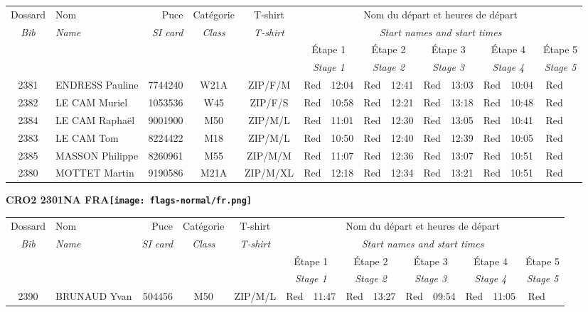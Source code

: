\documentclass{report}
\begin{document}
  \begin{longtable}{|c|l|r|c|c|*{5}{cc|}}
    Dossard & Nom  & Puce    & Catégorie & T-shirt & \multicolumn{10}{c|}{Nom du départ et heures de départ} \\
    \itshape Bib     & \itshape Name & \itshape SI card & \itshape Class  & \itshape  T-shirt  & \multicolumn{10}{c|}{\itshape Start names and start times} \\
    \hline
    & & & & & \multicolumn{2}{c|}{Étape 1} & \multicolumn{2}{c|}{Étape 2} & \multicolumn{2}{c|}{Étape 3} & \multicolumn{2}{c|}{Étape 4} & \multicolumn{2}{c|}{Étape 5} \\
    & & & & & \multicolumn{2}{c|}{\itshape Stage 1} & \multicolumn{2}{c|}{\itshape Stage 2} & \multicolumn{2}{c|}{\itshape Stage 3} & \multicolumn{2}{c|}{\itshape Stage 4} & \multicolumn{2}{c|}{\itshape Stage 5} \\
    \hline
    2381 & ENDRESS Pauline & 7744240 & W21A & ZIP/F/M & Red & 12:04 & Red & 12:41 & Red & 13:03 & Red & 10:04 & Red &  \\
    2382 & LE CAM Muriel & 1053536 & W45 & ZIP/F/S & Red & 10:58 & Red & 12:21 & Red & 13:18 & Red & 10:48 & Red &  \\
    2384 & LE CAM Raphaël & 9001900 & M50 & ZIP/M/L & Red & 11:01 & Red & 12:30 & Red & 13:05 & Red & 10:41 & Red &  \\
    2383 & LE CAM Tom & 8224422 & M18 & ZIP/M/L & Red & 10:50 & Red & 12:40 & Red & 12:39 & Red & 10:05 & Red &  \\
    2385 & MASSON Philippe & 8260961 & M55 & ZIP/M/M & Red & 11:07 & Red & 12:36 & Red & 13:07 & Red & 10:51 & Red &  \\
    2380 & MOTTET Martin & 9190586 & M21A & ZIP/M/XL & Red & 12:18 & Red & 12:34 & Red & 13:21 & Red & 10:51 & Red &  \\
  \end{longtable}
\newpage
  \Huge \centering \bfseries CRO2 2301NA FRA\normalfont \footnotesize \sffamily \hfill \texttt{[image: flags-normal/fr.png]} \newline 
  \begin{longtable}{|c|l|r|c|c|*{5}{cc|}}
    Dossard & Nom  & Puce    & Catégorie & T-shirt & \multicolumn{10}{c|}{Nom du départ et heures de départ} \\
    \itshape Bib     & \itshape Name & \itshape SI card & \itshape Class  & \itshape  T-shirt  & \multicolumn{10}{c|}{\itshape Start names and start times} \\
    \hline
    & & & & & \multicolumn{2}{c|}{Étape 1} & \multicolumn{2}{c|}{Étape 2} & \multicolumn{2}{c|}{Étape 3} & \multicolumn{2}{c|}{Étape 4} & \multicolumn{2}{c|}{Étape 5} \\
    & & & & & \multicolumn{2}{c|}{\itshape Stage 1} & \multicolumn{2}{c|}{\itshape Stage 2} & \multicolumn{2}{c|}{\itshape Stage 3} & \multicolumn{2}{c|}{\itshape Stage 4} & \multicolumn{2}{c|}{\itshape Stage 5} \\
    \hline
    2390 & BRUNAUD Yvan & 504456 & M50 & ZIP/M/L & Red & 11:47 & Red & 13:27 & Red & 09:54 & Red & 11:05 & Red &  \\
  \end{longtable}
\end{document}
